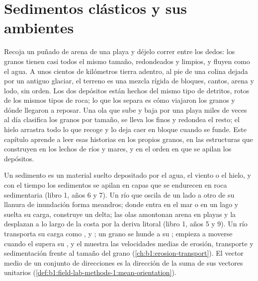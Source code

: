 \chapter{Sedimentos clásticos y sus ambientes}\label{ch:b1:clastic-sediments}

Recoja un puñado de arena de una playa y déjelo correr entre los dedos: los granos tienen casi todos el mismo tamaño, redondeados y limpios, y fluyen como el agua.
A unos cientos de kilómetros tierra adentro, al pie de una colina dejada por un antiguo glaciar, el terreno es una mezcla rígida de bloques, cantos, arena y lodo,
sin orden. Los dos depósitos están hechos del mismo tipo de detritos, rotos de los mismos tipos de roca; lo que los separa es cómo viajaron los granos y dónde
llegaron a reposar. Una ola que sube y baja por una playa miles de veces al día clasifica los granos por tamaño, se lleva los finos y redondea el resto; el hielo
arrastra todo lo que recoge y lo deja caer en bloque cuando se funde. Este capítulo aprende a leer esas historias en los propios granos, en las estructuras que
construyen en los lechos de ríos y mares, y en el orden en que se apilan los depósitos.

\begin{recall}
Un sedimento es un material suelto depositado por el agua, el viento o el hielo, y con el tiempo los sedimentos se apilan en capas que se endurecen en roca
sedimentaria (libro 1, años 6 y 7). Un río que oscila de un lado a otro de su llanura de inundación forma meandros; donde entra en el mar o en un lago y suelta su
carga, construye un delta; las olas amontonan arena en playas y la desplazan a lo largo de la costa por la deriva litoral (libro 1, años 5 y 9). Un río transporta su
carga como ,  y ; un grano se hunde a su ; empieza a moverse cuando el  supera su , y el  muestra las velocidades medias de erosión, transporte y sedimentación frente al tamaño del grano
(\cref{ch:b1:erosion-transport}). El vector medio de un conjunto de direcciones es la dirección de la suma de sus vectores unitarios
(\cref{def:b1:field-lab-methods-1:mean-orientation}).
\end{recall}

